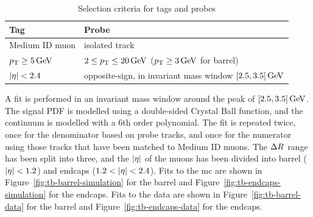 \begin{table}[!htb]
	\centering
	\label{tab:tag-probe-def}
		\caption{Selection criteria for tags and probes}
			\begin{tabular}{l|l} \hline
			Tag & Probe \\ \hline
			Medium ID muon & isolated track\\
			$p_{\mathrm{T}} \geq 5\,\text{Ge\hspace{-.08em}V}$ & $2\leq p_{\mathrm{T}}\leq 20\,\text{Ge\hspace{-.08em}V}$  ($ p_{\mathrm{T}}\geq 3 \,\text{Ge\hspace{-.08em}V} $ for barrel) \\
			$\abs{\eta}<2.4$ & opposite-sign, in invariant mass window $[2.5,3.5]\,\text{Ge\hspace{-.08em}V}$ \\ \hline
			\end{tabular}
\end{table}

A fit is performed in an invariant mass window around the \JPsi peak of $[2.5,3.5]\,\text{Ge\hspace{-.08em}V}$. The signal PDF is modelled using a double-sided Crystal Ball function, and the continuum is modelled with a 6th order polynomial. The fit is repeated twice, once for the denominator based on probe tracks, and once for the numerator using those tracks that have been matched to Medium ID muons. The $\Delta R$ range has been split into three, and the $\abs{\eta}$ of the muons has been divided into barrel ($\abs{\eta}<1.2$) and endcaps ($1.2<\abs{\eta}<2.4$). Fits to the \gls{mc} are shown in Figure~\ref{fig:tb-barrel-simulation} for the barrel and Figure~\ref{fig:tb-endcaps-simulation} for the endcaps. Fits to the data are shown in Figure~\ref{fig:tb-barrel-data} for the barrel and Figure~\ref{fig:tb-endcaps-data} for the endcaps.

